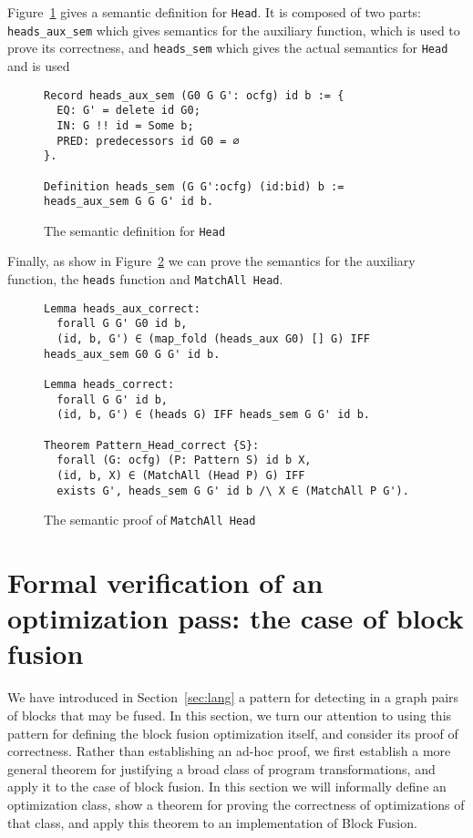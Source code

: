 \documentclass[11pt]{article}
\newcommand{\inlinecoq}[1]{\mbox{\lstinline[style=customcoq,columns=fixed,basewidth=.48em]{#1}}}
\newcommand{\ilc}[1]{\inlinecoq{#1}}
\newcommand{\yzt}[1]{\textcolor{ForestGreen!50}{#1}}
\newcommand{\cut}[1]{\textcolor{Gray!40}{#1}}
\begin{document}
Figure~\ref{fig:sem_head_def} gives a semantic definition for \ilc{Head}. It is composed of two parts: \ilc{heads_aux_sem} which gives semantics for the auxiliary function, which is used to prove its correctness, and \ilc{heads_sem} which gives the actual semantics for \ilc{Head} and is used 

\begin{figure}
  \begin{lstlisting}[style=customcoq,basicstyle=\small\ttfamily]
Record heads_aux_sem (G0 G G': ocfg) id b := {
  EQ: G' = delete id G0;
  IN: G !! id = Some b;
  PRED: predecessors id G0 = ∅
}.

Definition heads_sem (G G':ocfg) (id:bid) b := heads_aux_sem G G G' id b.
  \end{lstlisting}
  \caption{The semantic definition for \ilc{Head}}
  \label{fig:sem_head_def}
\end{figure}

Finally, as show in Figure~\ref{fig:head_cor} we can prove the semantics for the auxiliary function, the \ilc{heads} function and \ilc{MatchAll Head}.

\begin{figure}
  \begin{lstlisting}[style=customcoq,basicstyle=\small\ttfamily]
Lemma heads_aux_correct:
  forall G G' G0 id b,
  (id, b, G') ∈ (map_fold (heads_aux G0) [] G) IFF heads_aux_sem G0 G G' id b.

Lemma heads_correct:
  forall G G' id b,
  (id, b, G') ∈ (heads G) IFF heads_sem G G' id b.

Theorem Pattern_Head_correct {S}:
  forall (G: ocfg) (P: Pattern S) id b X,
  (id, b, X) ∈ (MatchAll (Head P) G) IFF
  exists G', heads_sem G G' id b /\ X ∈ (MatchAll P G').
  \end{lstlisting}
  \caption{The semantic proof of \ilc{MatchAll Head}}
  \label{fig:head_cor}
\end{figure}

\section{Formal verification of an optimization pass: the case of block fusion}
\label{sec:deno}

\yzt{We have introduced in Section~\ref{sec:lang} a pattern for detecting in a graph pairs of blocks that may be fused. In this section, we turn our attention to using this pattern for defining the block fusion optimization itself, and consider its proof of correctness. Rather than establishing an ad-hoc proof, we first establish a more general theorem for justifying a broad class of program transformations, and apply it to the case of block fusion.}
\cut{In this section we will informally define an optimization class, show a theorem for proving the correctness of optimizations of that class, and apply this theorem to an implementation of Block Fusion.}
\end{document}
